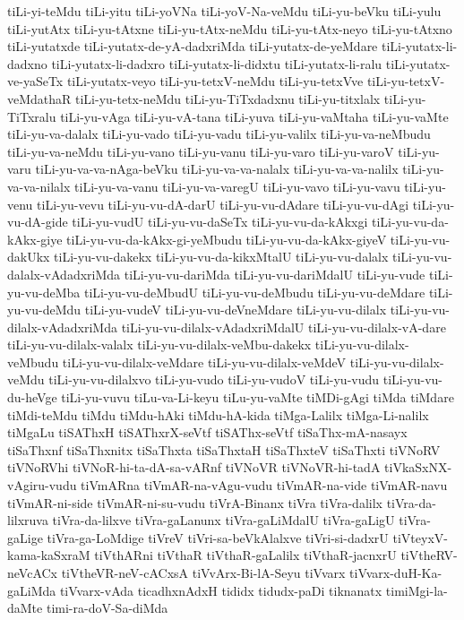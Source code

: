 {tiLi-yi-teMdu
tiLi-yitu
tiLi-yoVNa
tiLi-yoV-Na-veMdu
tiLi-yu-beVku
tiLi-yulu
tiLi-yutAtx
tiLi-yu-tAtxne
tiLi-yu-tAtx-neMdu
tiLi-yu-tAtx-neyo
tiLi-yu-tAtxno
tiLi-yutatxde
tiLi-yutatx-de-yA-dadxriMda
tiLi-yutatx-de-yeMdare
tiLi-yutatx-li-dadxno
tiLi-yutatx-li-dadxro
tiLi-yutatx-li-didxtu
tiLi-yutatx-li-ralu
tiLi-yutatx-ve-yaSeTx
tiLi-yutatx-veyo
tiLi-yu-tetxV-neMdu
tiLi-yu-tetxVve
tiLi-yu-tetxV-veMdathaR
tiLi-yu-tetx-neMdu
tiLi-yu-TiTxdadxnu
tiLi-yu-titxlalx
tiLi-yu-TiTxralu
tiLi-yu-vAga
tiLi-yu-vA-tana
tiLi-yuva
tiLi-yu-vaMtaha
tiLi-yu-vaMte
tiLi-yu-va-dalalx
tiLi-yu-vado
tiLi-yu-vadu
tiLi-yu-valilx
tiLi-yu-va-neMbudu
tiLi-yu-va-neMdu
tiLi-yu-vano
tiLi-yu-vanu
tiLi-yu-varo
tiLi-yu-varoV
tiLi-yu-varu
tiLi-yu-va-va-nAga-beVku
tiLi-yu-va-va-nalalx
tiLi-yu-va-va-nalilx
tiLi-yu-va-va-nilalx
tiLi-yu-va-vanu
tiLi-yu-va-varegU
tiLi-yu-vavo
tiLi-yu-vavu
tiLi-yu-venu
tiLi-yu-vevu
tiLi-yu-vu-dA-darU
tiLi-yu-vu-dAdare
tiLi-yu-vu-dAgi
tiLi-yu-vu-dA-gide
tiLi-yu-vudU
tiLi-yu-vu-daSeTx
tiLi-yu-vu-da-kAkxgi
tiLi-yu-vu-da-kAkx-giye
tiLi-yu-vu-da-kAkx-gi-yeMbudu
tiLi-yu-vu-da-kAkx-giyeV
tiLi-yu-vu-dakUkx
tiLi-yu-vu-dakekx
tiLi-yu-vu-da-kikxMtalU
tiLi-yu-vu-dalalx
tiLi-yu-vu-dalalx-vAdadxriMda
tiLi-yu-vu-dariMda
tiLi-yu-vu-dariMdalU
tiLi-yu-vude
tiLi-yu-vu-deMba
tiLi-yu-vu-deMbudU
tiLi-yu-vu-deMbudu
tiLi-yu-vu-deMdare
tiLi-yu-vu-deMdu
tiLi-yu-vudeV
tiLi-yu-vu-deVneMdare
tiLi-yu-vu-dilalx
tiLi-yu-vu-dilalx-vAdadxriMda
tiLi-yu-vu-dilalx-vAdadxriMdalU
tiLi-yu-vu-dilalx-vA-dare
tiLi-yu-vu-dilalx-valalx
tiLi-yu-vu-dilalx-veMbu-dakekx
tiLi-yu-vu-dilalx-veMbudu
tiLi-yu-vu-dilalx-veMdare
tiLi-yu-vu-dilalx-veMdeV
tiLi-yu-vu-dilalx-veMdu
tiLi-yu-vu-dilalxvo
tiLi-yu-vudo
tiLi-yu-vudoV
tiLi-yu-vudu
tiLi-yu-vu-du-heVge
tiLi-yu-vuvu
tiLu-va-Li-keyu
tiLu-yu-vaMte
tiMDi-gAgi
tiMda
tiMdare
tiMdi-teMdu
tiMdu
tiMdu-hAki
tiMdu-hA-kida
tiMga-Lalilx
tiMga-Li-nalilx
tiMgaLu
tiSAThxH
tiSAThxrX-seVtf
tiSAThx-seVtf
tiSaThx-mA-nasayx
tiSaThxnf
tiSaThxnitx
tiSaThxta
tiSaThxtaH
tiSaThxteV
tiSaThxti
tiVNoRV
tiVNoRVhi
tiVNoR-hi-ta-dA-sa-vARnf
tiVNoVR
tiVNoVR-hi-tadA
tiVkaSxNX-vAgiru-vudu
tiVmARna
tiVmAR-na-vAgu-vudu
tiVmAR-na-vide
tiVmAR-navu
tiVmAR-ni-side
tiVmAR-ni-su-vudu
tiVrA-Binanx
tiVra
tiVra-dalilx
tiVra-da-lilxruva
tiVra-da-lilxve
tiVra-gaLanunx
tiVra-gaLiMdalU
tiVra-gaLigU
tiVra-gaLige
tiVra-ga-LoMdige
tiVreV
tiVri-sa-beVkAlalxve
tiVri-si-dadxrU
tiVteyxV-kama-kaSxraM
tiVthARni
tiVthaR
tiVthaR-gaLalilx
tiVthaR-jacnxrU
tiVtheRV-neVcACx
tiVtheVR-neV-cACxsA
tiVvArx-Bi-lA-Seyu
tiVvarx
tiVvarx-duH-Ka-gaLiMda
tiVvarx-vAda
ticadhxnAdxH
tididx
tidudx-paDi
tiknanatx
timiMgi-la-daMte
timi-ra-doV-Sa-diMda
}
